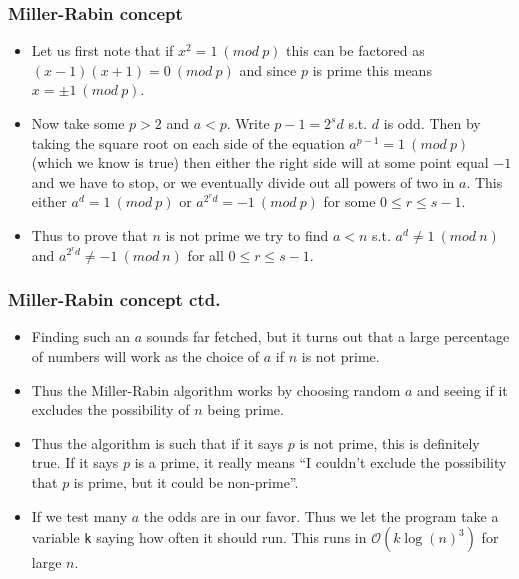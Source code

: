 \documentclass{beamer}
\begin{document}
\begin{frame}[plain]
\frametitle{Miller-Rabin concept}

\begin{itemize}

\item<1-> Let us first note that if $x^2 = 1 \ (mod \ p)$ this can be factored as $(x-1)(x+1) = 0 \ (mod \ p)$ and since $p$ is prime this means $x = \pm 1 \ (mod \ p)$.

\item<2-> Now take some $p > 2$ and $a < p$. Write $p - 1 = 2^sd$ s.t. $d$ is odd. Then by taking the square root on each side of the equation $a^{p - 1} = 1 \ (mod \ p)$ (which we know is true) then either the right side will at some point equal $-1$ and we have to stop, or we eventually divide out all powers of two in $a$. This either $a^d = 1 \ (mod \ p)$ or $a^{2^r d} = -1 \ (mod \ p)$ for some $0 \leq r \leq s - 1$.

\item<3-> Thus to prove that $n$ is not prime we try to find $a < n$ s.t. $a^d \neq 1 \ (mod \ n)$ and $a^{2^rd} \neq -1 \ (mod \ n)$ for all $0 \leq r \leq s - 1$.

\end{itemize}

\end{frame}

\begin{frame}[plain]
\frametitle{Miller-Rabin concept ctd.}

\begin{itemize}

    \item<1-> Finding such an $a$ sounds far fetched, but it turns out that a large percentage of numbers will work as the choice of $a$ if $n$ is not prime.
    \item<2-> Thus the Miller-Rabin algorithm works by choosing random $a$ and seeing if it excludes the possibility of $n$ being prime.

    \item<3-> Thus the algorithm is such that if it says $p$ is not prime, this is definitely true. If it says $p$ is a prime, it really means ``I couldn't exclude the possibility that $p$ is prime, but it could be non-prime''. 

    \item<4-> If we test many $a$ the odds are in our favor. Thus we let the program take a variable \texttt{k} saying how often it should run. This runs in $\mathcal{O}(k\log(n)^3)$ for large $n$.

\end{itemize}

\end{frame}
\end{document}
